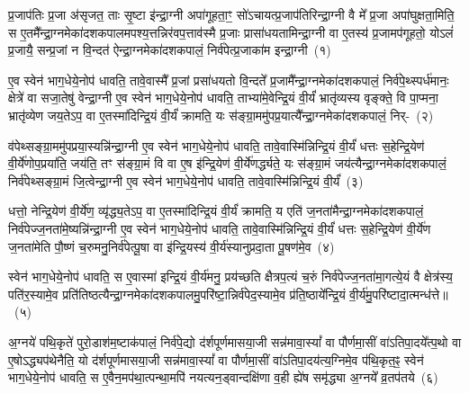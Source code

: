 \setcounter{anuvakam}{0}
प्र॒जा\-प॑तिः प्र॒जा अ॑सृजत॒ ताः सृ॒ष्टा इ॑न्द्रा॒ग्नी अपा॑गूहता॒ꣳ॒ सो॑\-ऽचायत्प्र॒जा\-प॑तिरिन्द्रा॒ग्नी वै मे᳚ प्र॒जा अपा॑घुक्षता॒मिति॒ स ए॒तमै᳚न्द्रा॒ग्नमेका॑\-दश\-कपालमपश्य॒त्तन्निर॑वप॒त्ताव॑स्मै प्र॒जाः प्रासा॑धयतामिन्द्रा॒ग्नी वा ए॒तस्य॑ प्र॒जामप॑गूहतो॒ यो\-ऽलं॑ प्र॒जायै॒ सन्प्र॒जां न वि॒न्दत॑ ऐन्द्रा॒ग्नमेका॑\-दश\-कपालं॒ निर्व॑पेत्प्र॒जाका॑म इन्द्रा॒ग्नी~(१)\ip

ए॒व स्वेन॑ भाग॒\-धेये॒नोप॑ धावति॒ तावे॒वास्मै᳚ प्र॒जां प्रसा॑धयतो वि॒न्दते᳚ प्र॒जामै᳚न्द्रा॒ग्नमेका॑\-दश\-कपालं॒ निर्व॑पे॒थ्स्पर्ध॑मानः॒ क्षेत्रे॑ वा सजा॒तेषु॑ वेन्द्रा॒ग्नी ए॒व स्वेन॑ भाग॒\-धेये॒नोप॑ धावति॒ ताभ्या॑मे॒वेन्द्रि॒यं वी॒र्यं॑ भ्रातृ॑व्यस्य वृङ्क्ते॒ वि पा॒प्मना॒ भ्रातृ॑व्येण जय॒ते\-ऽप॒ वा ए॒तस्मा॑दिन्द्रि॒यं वी॒र्यं॑ क्रामति॒ यः स॑ङ्ग्रा॒ममु॑पप्र॒यात्यै᳚न्द्रा॒ग्नमेका॑\-दश\-कपालं॒ निर्-~(२)\ip

व॑पेथ्सङ्ग्रा॒ममु॑पप्रया॒स्यन्नि॑न्द्रा॒ग्नी ए॒व स्वेन॑ भाग॒\-धेये॒नोप॑ धावति॒ तावे॒वास्मि॑न्निन्द्रि॒यं वी॒र्यं॑ धत्तः स॒हेन्द्रि॒येण॑ वी॒र्ये॑णोप॒प्रया॑ति॒ जय॑ति॒ तꣳ स॑ङ्ग्रा॒मं वि वा ए॒ष इ॑न्द्रि॒येण॑ वी॒र्ये॑णर्द्ध्यते॒ यः स॑ङ्ग्रा॒मं जय॑त्यैन्द्रा॒ग्नमेका॑\-दश\-कपालं॒ निर्व॑पेथ्सङ्ग्रा॒मं जि॒त्वेन्द्रा॒ग्नी ए॒व स्वेन॑ भाग॒\-धेये॒नोप॑ धावति॒ तावे॒वास्मि॑न्निन्द्रि॒यं वी॒र्यं॑~(३)\ip

धत्तो॒ नेन्द्रि॒येण॑ वी॒र्ये॑ण॒ व्यृ॑द्ध्य॒ते\-ऽप॒ वा ए॒तस्मा॑दिन्द्रि॒यं वी॒र्यं॑ क्रामति॒ य एति॑ ज॒नता॑मैन्द्रा॒ग्नमेका॑\-दश\-कपालं॒ निर्व॑पेज्ज॒नता॑\-मे॒ष्यन्नि॑न्द्रा॒ग्नी ए॒व स्वेन॑ भाग॒\-धेये॒नोप॑ धावति॒ तावे॒वास्मि॑न्निन्द्रि॒यं वी॒र्यं॑ धत्तः स॒हेन्द्रि॒येण॑ वी॒र्ये॑ण ज॒नता॑मेति पौ॒ष्णं च॒रुमनु॒निर्व॑पेत्पू॒षा वा इ॑न्द्रि॒यस्य॑ वी॒र्य॑स्यानुप्रदा॒ता पू॒षण॑मे॒व~(४)\ip

स्वेन॑ भाग॒\-धेये॒नोप॑ धावति॒ स ए॒वास्मा॑ इन्द्रि॒यं वी॒र्य॑मनु॒ प्रय॑च्छति क्षैत्रप॒त्यं च॒रुं निर्व॑पेज्ज॒नता॑मा॒गत्ये॒यं वै क्षेत्र॑स्य॒ पति॑र॒स्यामे॒व प्रति॑तिष्ठत्यैन्द्रा॒ग्नमेका॑\-दश\-कपालमु॒परि॑ष्टा॒\-न्निर्व॑पेद॒स्यामे॒व प्र॑ति॒ष्ठाये᳚न्द्रि॒यं वी॒र्य॑मु॒परि॑ष्टादा॒त्मन्ध॑त्ते॥~(५)\ip

{\anuvakamend[{प्र॒जाका॑म इन्द्रा॒ग्नी उ॑पप्र॒यात्यै᳚न्द्रा॒ग्नमेका॑\-दश\-कपालं॒ निर्वी॒र्यं॑ पू॒षण॑मे॒वैका॒न्नच॑त्वारि॒ꣳ॒शच्च॑}]}

अ॒ग्नये॑ पथि॒कृते॑ पुरो॒डाश॑\-म॒ष्टा\-क॑पालं॒ निर्व॑पे॒द्यो द॑र्\mbox{}शपूर्णमास\-या॒जी सन्न॑मावा॒स्यां᳚ वा पौर्णमा॒सीं वा॑\-ऽतिपा॒दये᳚त्प॒थो वा ए॒षो\-ऽद्ध्यप॑थेनैति॒ यो द॑र्\mbox{}शपूर्णमासया॒जी सन्न॑मावा॒स्यां᳚ वा पौर्णमा॒सीं वा॑\-ऽतिपा॒दय॑त्य॒ग्निमे॒व प॑थि॒कृत॒ꣴ॒ स्वेन॑ भाग॒\-धेये॒नोप॑ धावति॒ स ए॒वैन॒मप॑था॒त्पन्था॒मपि॑ नयत्यन॒ड्वान्दक्षि॑णा व॒ही ह्ये॑ष समृ॑द्ध्या अ॒ग्नये᳚ व्र॒तप॑तये~(६)\ip

